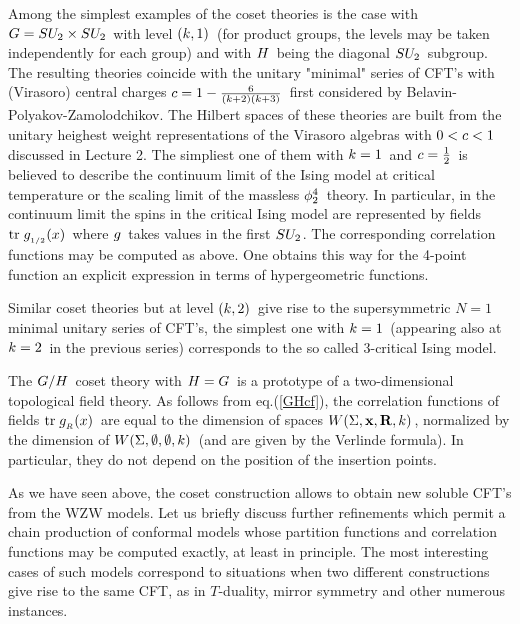 Among the simplest examples of the coset theories
is the case with \s$G=SU_2\times SU_2\hspace{0.05cm}$ with level
\s$(k,1)\hspace{0.05cm}$ (for product groups, the levels may
be taken independently for each group) and with \s$H\hspace{0.05cm}$
being the diagonal \s$SU_2\hspace{0.05cm}$ subgroup. The resulting
theories coincide with the unitary "minimal" series of
CFT's with (Virasoro) central charges
\s$c=1-{6\over{(k+2)(k+3)}}\hspace{0.05cm}$ first considered by
Belavin-Polyakov-Zamolodchikov.
The Hilbert spaces of these theories are built
from the unitary heighest weight representations
of the Virasoro algebras with \s$0<c<1\hspace{0.05cm}$ discussed
in Lecture 2. The simpliest one of them with
\s$k=1\hspace{0.05cm}$ and \s$c={1\over2}\hspace{0.05cm}$
is believed to describe the continuum limit of the
Ising model at critical temperature or the scaling limit
of the massless \s$\phi^4_2\hspace{0.05cm}$ theory. In particular,
in the continuum limit the spins in
the critical Ising model are represented
by fields \s$\tr\s\s g_{_{1/2}}(x)\s$ where \s$g\hspace{0.05cm}$ takes
values in the first \s$SU_2\hspace{0.025cm}$. \s The corresponding correlation
functions may be computed as above. One obtains this way
for the 4-point function an explicit expression in terms
of hypergeometric functions.
\vskip 0.3cm

Similar coset theories but at level \s$(k,2)\hspace{0.05cm}$ give rise
to the supersymmetric $N=1$ minimal unitary series of
CFT's, the simplest one with \s$k=1\hspace{0.05cm}$
(appearing also at \s$k=2\hspace{0.05cm}$ in the previous series)
corresponds to the so called 3-critical Ising model.
\vskip 0.3cm

The \s$G/H\hspace{0.05cm}$ coset theory with \s$H=G\hspace{0.05cm}$ is a prototype
of a two-dimensional topological field theory. As follows from
eq.\s\s(\ref{GHcf}), the correlation functions of fields
\s$\tr\s\s g_{_R}(x)\s$ are equal to the dimension of
spaces \s$W(\Sigma,{{\bf x}},{{\bf R}},k)\hspace{0.05cm}$, normalized by the dimension
of \s$W(\Sigma,\emptyset,\emptyset,k)\hspace{0.05cm}$ (and are given by the Verlinde
formula). In particular, they do not depend on the position
of the insertion points.
\vskip 1cm



\vskip 0.6cm

As we have seen above, the coset construction
allows to obtain new soluble CFT's
from the WZW models. Let us briefly discuss further refinements
which permit a chain production of conformal models
whose partition functions and correlation
functions may be computed exactly, at least in principle.
The most interesting cases of such models correspond
to situations when two different constructions give rise to the same
CFT, as in \s$T$-duality, mirror
symmetry and other numerous instances.
\vskip 0.4cm

